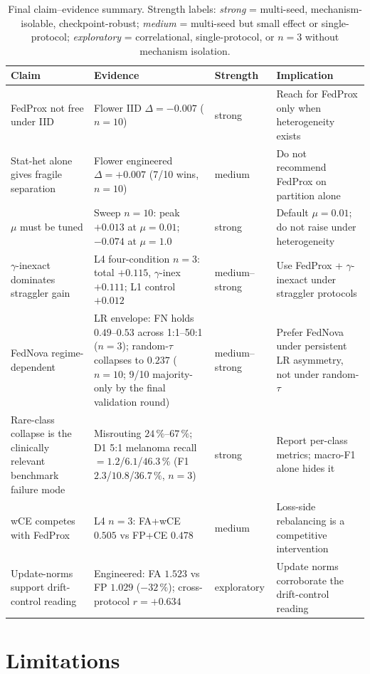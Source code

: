 \documentclass[11pt,a4paper]{report}
\begin{document}
\begin{table}[H]
\centering
\small
\caption[Final claim--evidence summary]{Final claim--evidence summary. Strength labels: \emph{strong}
= multi-seed, mechanism-isolable, checkpoint-robust; \emph{medium} =
multi-seed but small effect or single-protocol; \emph{exploratory} =
correlational, single-protocol, or $n=3$ without mechanism isolation.}
\label{tab:final-claims}
\begin{tabular}{p{3.0cm}p{5.0cm}p{1.7cm}p{3.6cm}}
\toprule
Claim & Evidence & Strength & Implication \\
\midrule
FedProx not free under IID & Flower IID $\Delta = -0.007$ ($n=10$) & strong & Reach for FedProx only when heterogeneity exists \\
Stat-het alone gives fragile separation & Flower engineered $\Delta = +0.007$ (7/10 wins, $n=10$) & medium & Do not recommend FedProx on partition alone \\
$\mu$ must be tuned & Sweep $n=10$: peak $+0.013$ at $\mu = 0.01$; $-0.074$ at $\mu = 1.0$ & strong & Default $\mu = 0.01$; do not raise under heterogeneity \\
$\gamma$-inexact dominates straggler gain & L4 four-condition $n=3$: total $+0.115$, $\gamma$-inex $+0.111$; L1 control $+0.012$ & medium--strong & Use FedProx + $\gamma$-inexact under straggler protocols \\
FedNova regime-dependent & LR envelope: FN holds $0.49$--$0.53$ across 1:1--50:1 ($n=3$); random-$\tau$ collapses to $0.237$ ($n=10$; 9/10 majority-only by the final validation round) & medium--strong & Prefer FedNova under persistent LR asymmetry, not under random-$\tau$ \\
Rare-class collapse is the clinically relevant benchmark failure mode & Misrouting $24\,\%$--$67\,\%$; D1 5:1 melanoma recall $= 1.2$/$6.1$/$46.3\,\%$ (F1 $2.3$/$10.8$/$36.7\,\%$, $n=3$) & strong & Report per-class metrics; macro-F1 alone hides it \\
wCE competes with FedProx & L4 $n=3$: FA+wCE $0.505$ vs FP+CE $0.478$ & medium & Loss-side rebalancing is a competitive intervention \\
Update-norms support drift-control reading & Engineered: FA $1.523$ vs FP $1.029$ ($-32\,\%$); cross-protocol $r = +0.634$ & exploratory & Update norms corroborate the drift-control reading \\
\bottomrule
\end{tabular}
\end{table}

\section{Limitations}
\label{sec:limitations}
\end{document}
